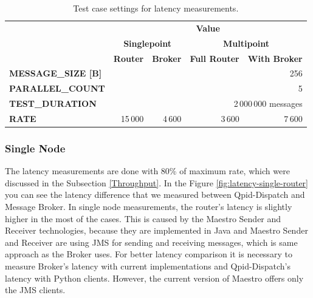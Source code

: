 \begingroup
\setlength{\tabcolsep}{10pt} %
\renewcommand{\arraystretch}{1.35} %
	\begin{table}[H]
	\centering
	\caption{Test case settings for latency measurements.}
	\label{tab:test_case_latency}
	\begin{tabular}{|l|r|r|r|r|}
	\hline
	\rowcolor[HTML]{C5E3DF}
	\cellcolor[HTML]{C5E3DF}                                         & \multicolumn{4}{c|}{\cellcolor[HTML]{C5E3DF}\textbf{Value}}                                                                          \\ \cline{2-5}
	\rowcolor[HTML]{C5E3DF}
	\cellcolor[HTML]{C5E3DF}                                         & \multicolumn{2}{c|}{\cellcolor[HTML]{C5E3DF}\textbf{Singlepoint}} & \multicolumn{2}{c|}{\cellcolor[HTML]{C5E3DF}\textbf{Multipoint}} \\ \cline{2-5}
	\rowcolor[HTML]{C5E3DF}
	\multirow{-3}{*}{\cellcolor[HTML]{C5E3DF}\textbf{Test Property}} & \textbf{Router}                            & \textbf{Broker}      & \textbf{Full Router}            & \textbf{With Broker}           \\ \hline
	\textbf{MESSAGE\_SIZE [B]}                                       & \multicolumn{4}{r|}{256}                  \\ \hline
	\textbf{PARALLEL\_COUNT}                                         & \multicolumn{4}{r|}{5}                    \\ \hline
	\textbf{TEST\_DURATION}                                       & \multicolumn{4}{r|}{2\,000\,000 messages}          \\ \hline
	\textbf{RATE}                                                    & 15\,000      & 4\,600                    & 3\,600                    & 7\,600                   \\ \hline
	\end{tabular}
	\end{table}
\endgroup

\subsubsection*{Single Node}
The latency measurements are done with 80\% of maximum rate, which were discussed in the Subsection \ref{Throughput}. In the Figure \ref{fig:latency-single-router} you can see the latency difference that we measured between Qpid-Dispatch and Message Broker. In single node measurements, the router's latency is slightly higher in the most of the cases. This is caused by the Maestro Sender and Receiver technologies, because they are implemented in Java and Maestro Sender and Receiver are using JMS for sending and receiving messages, which is same approach as the Broker uses. For better latency comparison it is necessary to measure Broker's latency with current implementations and Qpid-Dispatch's latency with Python clients. However, the current version of Maestro offers only the JMS clients.

